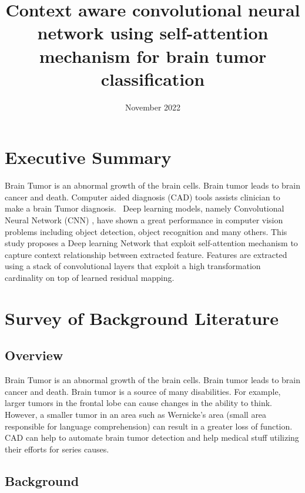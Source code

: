 \documentclass{article}
\title{Context aware convolutional neural network using self-attention mechanism for brain tumor classification}
\date{November 2022}
\begin{document}
\maketitle


\section{Executive Summary}

Brain Tumor is an abnormal growth of the brain cells\cite{deangelis2001brain}. Brain tumor leads to brain cancer and death\cite{deangelis2001brain}. Computer aided diagnosis (CAD) tools assists clinician to make a brain Tumor diagnosis.
~Deep learning \cite{lecun2015deep} models, namely Convolutional Neural Network (CNN) \cite{lecun1989handwritten}, have shown a great performance in computer vision problems including object detection\cite{erhan2014scalable}\cite{girshick2014rich}\cite{sermanet2013overfeat}\cite{redmon2016you}, object recognition\cite{simonyan2014very}\cite{he2016deep} and many others.
This study proposes a Deep learning Network that exploit self-attention mechanism \cite{vaswani2017attention} to capture context relationship between extracted feature. Features are extracted using a stack of convolutional layers that exploit a high transformation cardinality\cite{xie2017aggregated} on top of learned residual mapping\cite{he2016deep}.


\section{Survey of Background Literature}

\subsection{Overview}
Brain Tumor is an abnormal growth of the brain cells\cite{deangelis2001brain}. Brain tumor leads to brain cancer and death\cite{deangelis2001brain}. Brain tumor is a source of many disabilities. For example, larger tumors in the frontal lobe can cause changes in the ability to think. However, a smaller tumor in an area such as Wernicke's area (small area responsible for language comprehension) can result in a greater loss of function. CAD can help to automate brain tumor detection and help medical stuff utilizing their efforts for series causes.

\subsection{Background}
\end{document}
